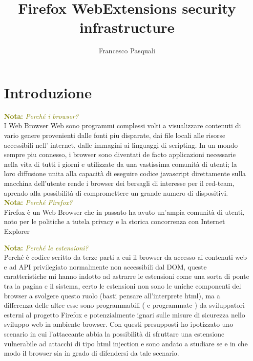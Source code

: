 \documentclass[]{./sapthesis/sapthesis}
\title{Firefox WebExtensions security infrastructure}
\author{Francesco Pasquali}
\newcommand{\MComment}[3]{\textcolor{#3}{ \textbf{#1} \textit{#2}}}
\newcommand{\Nota}[1]{\MComment{Nota:}{#1}{olive}}
\begin{document}
\maketitle
\tableofcontents

\newpage


\mainmatter
\chapter{Introduzione}
    \Nota{Perché i browser?}\\
    I Web Browser Web sono programmi complessi volti a visualizzare contenuti di vario genere
    provenienti dalle fonti piu disparate, dai file locali alle risorse accessibili nell'
    internet, dalle immagini ai linguaggi di scripting. In un mondo sempre piu connesso, i
    browser sono diventati de facto applicazioni necessarie nella vita di tutti i giorni e
    utilizzate da una vastissima comunità di utenti; la loro diffusione unita alla capacità
    di eseguire codice javascript direttamente sulla macchina dell'utente rende i browser
    dei bersagli di interesse per il red-team, aprendo alla possibilità di compromettere un
    grande numero di dispositivi.\\

    \Nota{Perché Firefox?}\\
    Firefox è un Web Browser che in passato ha avuto un'ampia comunità di utenti, noto per
    le politiche a tutela privacy e la storica concorrenza con Internet Explorer


    \Nota{Perché le estensioni?}\\
    Perché è codice scritto da terze parti a cui il browser da accesso ai contenuti web e
    ad API privilegiato normalmente non accessibili dal DOM, queste caratteristiche mi hanno
    indotto ad astrarre le estensioni come una sorta di ponte tra la pagina e il sistema,
    certo le estensioni non sono le uniche componenti del browser a svolgere questo ruolo
    (basti pensare all'interprete html), ma a differenza delle altre esse sono programmabili
    ( e programmate ) da sviluppatori esterni al progetto Firefox e potenzialmente
    ignari sulle misure di sicurezza nello sviluppo web in ambiente browser. 
    Con questi presupposti ho ipotizzato uno scenario in cui l'attaccante abbia la
    possibilità di sfruttare una estensione vulnerabile ad attacchi di tipo html injection
    e sono andato a studiare se e in che modo il browser sia in grado di difendersi
    da tale scenario.
\end{document}
